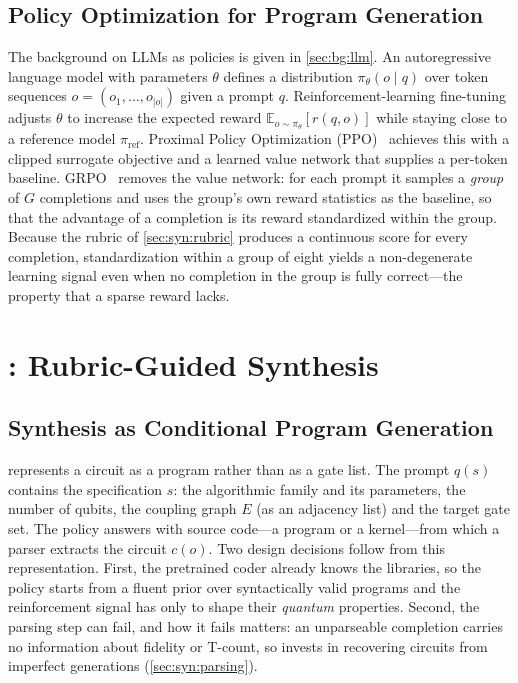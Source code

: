 \subsection{Policy Optimization for Program Generation}\label{sec:syn:po}

The background on LLMs as policies is given in \cref{sec:bg:llm}. An autoregressive language model with parameters $\theta$ defines a distribution $\pi_\theta(o\mid q)$ over token sequences $o=(o_1,\dots,o_{|o|})$ given a prompt $q$. Reinforcement-learning fine-tuning adjusts $\theta$ to increase the expected reward $\mathbb{E}_{o\sim\pi_\theta}[r(q,o)]$ while staying close to a reference model $\pi_{\mathrm{ref}}$. Proximal Policy Optimization (PPO)~\cite{schulman2017ppo} achieves this with a clipped surrogate objective and a learned value network that supplies a per-token baseline. GRPO~\cite{shao2024deepseekmath} removes the value network: for each prompt it samples a \emph{group} of $G$ completions and uses the group's own reward statistics as the baseline, so that the advantage of a completion is its reward standardized within the group. Because the rubric of \cref{sec:syn:rubric} produces a continuous score for every completion, standardization within a group of eight yields a non-degenerate learning signal even when no completion in the group is fully correct---the property that a sparse reward lacks.

\section{\rubriq{}: Rubric-Guided Synthesis}\label{sec:syn:rubriq}

\subsection{Synthesis as Conditional Program Generation}\label{sec:syn:formulation}

\rubriq{} represents a circuit as a program rather than as a gate list. The prompt $q(s)$ contains the specification $s$: the algorithmic family and its parameters, the number of qubits, the coupling graph $E$ (as an adjacency list) and the target gate set. The policy answers with source code---a \qiskit{} program or a \cudaq{} kernel---from which a parser extracts the circuit $c(o)$. Two design decisions follow from this representation. First, the pretrained coder already knows the libraries, so the policy starts from a fluent prior over syntactically valid programs and the reinforcement signal has only to shape their \emph{quantum} properties. Second, the parsing step can fail, and how it fails matters: an unparseable completion carries no information about fidelity or T-count, so \rubriq{} invests in recovering circuits from imperfect generations (\cref{sec:syn:parsing}).

